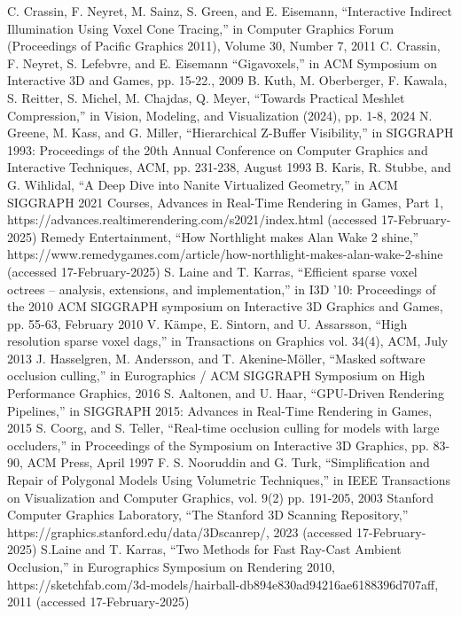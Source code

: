 \documentclass[conference]{IEEEtran}
\begin{document}
\begin{thebibliography}{00}
 C. Crassin, F. Neyret, M. Sainz, S. Green, and E. Eisemann, ``Interactive Indirect Illumination Using Voxel Cone Tracing,'' in Computer Graphics Forum (Proceedings of Pacific Graphics 2011), Volume 30, Number 7, 2011
 C. Crassin, F. Neyret, S. Lefebvre, and E. Eisemann ``Gigavoxels,'' in ACM Symposium on Interactive 3D and Games, pp. 15-22., 2009
 B. Kuth, M. Oberberger, F. Kawala, S. Reitter, S. Michel, M. Chajdas, Q. Meyer, ``Towards Practical Meshlet Compression,'' in Vision, Modeling, and Visualization (2024), pp. 1-8, 2024
 N. Greene, M. Kass, and G. Miller, ``Hierarchical Z-Buffer Visibility,'' in SIGGRAPH 1993: Proceedings of the 20th Annual Conference on Computer Graphics and Interactive Techniques, ACM, pp. 231-238, August 1993
 B. Karis, R. Stubbe, and G. Wihlidal, ``A Deep Dive into Nanite Virtualized Geometry,'' in ACM SIGGRAPH 2021 Courses, Advances in Real-Time Rendering in Games, Part 1, https://advances.realtimerendering.com/s2021/index.html (accessed 17-February-2025)
 Remedy Entertainment, ``How Northlight makes Alan Wake 2 shine,'' https://www.remedygames.com/article/how-northlight-makes-alan-wake-2-shine (accessed 17-February-2025)
 S. Laine and T. Karras, ``Efficient sparse voxel octrees – analysis, extensions, and implementation,'' in I3D '10: Proceedings of the 2010 ACM SIGGRAPH symposium on Interactive 3D Graphics and Games, pp. 55-63, February 2010
 V. Kämpe, E. Sintorn, and U. Assarsson, ``High resolution sparse voxel dags,'' in Transactions on Graphics vol. 34(4), ACM, July 2013
 J. Hasselgren, M. Andersson, and T. Akenine-Möller, ``Masked software occlusion culling,'' in Eurographics / ACM SIGGRAPH Symposium on High Performance Graphics, 2016
 S. Aaltonen, and U. Haar, ``GPU-Driven Rendering Pipelines,'' in SIGGRAPH 2015: Advances in Real-Time Rendering in Games, 2015
 S. Coorg, and S. Teller, ``Real-time occlusion culling for models with large occluders,'' in Proceedings of the Symposium on Interactive 3D Graphics, pp. 83-90, ACM Press, April 1997
 F. S. Nooruddin and G. Turk, ``Simplification and Repair of Polygonal Models Using Volumetric Techniques,'' in IEEE Transactions on Visualization and Computer Graphics, vol. 9(2) pp. 191-205, 2003
 Stanford Computer Graphics Laboratory, ``The Stanford 3D Scanning Repository,'' https://graphics.stanford.edu/data/3Dscanrep/, 2023 (accessed 17-February-2025)
 S.Laine and T. Karras, ``Two Methods for Fast Ray-Cast Ambient Occlusion,'' in Eurographics Symposium on Rendering 2010,  https://sketchfab.com/3d-models/hairball-db894e830ad94216ae6188396d707aff, 2011 (accessed 17-February-2025)
\end{thebibliography}
\vspace{12pt}
\end{document}
